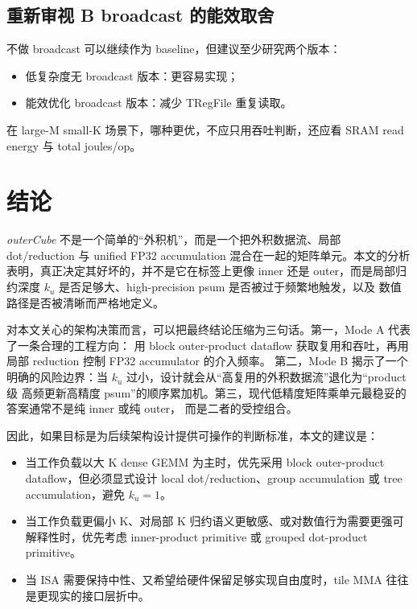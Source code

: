 \documentclass[UTF8,11pt,a4paper]{ctexart}
\newcommand{\ku}{\ensuremath{k_u}}
\newcommand{\modea}{Mode A}
\newcommand{\modeb}{Mode B}
\newcommand{\outercube}{\textit{outerCube}}
\begin{document}
\subsection{重新审视 B broadcast 的能效取舍}

不做 broadcast 可以继续作为 baseline，但建议至少研究两个版本：

\begin{itemize}
  \item 低复杂度无 broadcast 版本：更容易实现；
  \item 能效优化 broadcast 版本：减少 TRegFile 重复读取。
\end{itemize}

在 large-M small-K 场景下，哪种更优，不应只用吞吐判断，还应看 SRAM read energy 与 total joules/op。

\section{结论}

\outercube{} 不是一个简单的“外积机”，而是一个把外积数据流、局部 dot/reduction 与 unified FP32
accumulation 混合在一起的矩阵单元。本文的分析表明，真正决定其好坏的，并不是它在标签上更像 inner
还是 outer，而是局部归约深度 \ku{} 是否足够大、high-precision psum 是否被过于频繁地触发，以及
数值路径是否被清晰而严格地定义。

对本文关心的架构决策而言，可以把最终结论压缩为三句话。第一，\modea{} 代表了一条合理的工程方向：
用 block outer-product dataflow 获取复用和吞吐，再用局部 reduction 控制 FP32 accumulator 的介入频率。
第二，\modeb{} 揭示了一个明确的风险边界：当 \ku{} 过小，设计就会从“高复用的外积数据流”退化为“product 级
高频更新高精度 psum”的顺序累加机。第三，现代低精度矩阵乘单元最稳妥的答案通常不是纯 inner 或纯 outer，
而是二者的受控组合。

因此，如果目标是为后续架构设计提供可操作的判断标准，本文的建议是：
\begin{itemize}
  \item 当工作负载以大 K dense GEMM 为主时，优先采用 block outer-product dataflow，但必须显式设计
  local dot/reduction、group accumulation 或 tree accumulation，避免 $\ku=1$。
  \item 当工作负载更偏小 K、对局部 K 归约语义更敏感、或对数值行为需要更强可解释性时，优先考虑
  inner-product primitive 或 grouped dot-product primitive。
  \item 当 ISA 需要保持中性、又希望给硬件保留足够实现自由度时，tile MMA 往往是更现实的接口层折中。
\end{itemize}
\end{document}
